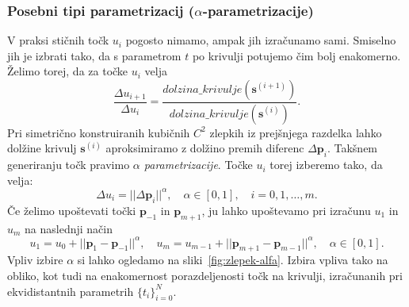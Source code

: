 \documentclass[isrm2, tisk]{fmfdelo}
\newcommand{\p}{\mathbf{p}}
\begin{document}
    \subsubsection{Posebni tipi parametrizacij ($\alpha$-parametrizacije)}
    V praksi stičnih točk $u_i$ pogosto nimamo, ampak jih izračunamo sami.
    Smiselno jih je izbrati tako, da s parametrom $t$ po krivulji potujemo čim bolj enakomerno.
    Želimo torej, da za točke $u_i$ velja \[\frac{\Delta u_{i+1}}{\Delta u_i} = \frac{dolzina\_krivulje(\mathbf{s}^{(i+1)})}{dolzina\_krivulje(\mathbf{s}^{(i)})}.\]
    Pri simetrično konstruiranih kubičnih $C^2$ zlepkih iz prejšnjega razdelka lahko dolžine krivulj $\mathbf{s}^{(i)}$ aproksimiramo z dolžino premih diferenc $\Delta \p_i$.
    Takšnem generiranju točk pravimo \textit{$\alpha$ parametrizacije}.
    Točke $u_i$ torej izberemo tako, da velja:
    \[\Delta u_i=||\Delta \p_i||^{\alpha},\quad \alpha\in[0,1],\quad i=0,1,\ldots,m.\]
    Če želimo upoštevati točki $\p_{-1}$ in $\p_{m+1}$, ju lahko upoštevamo pri izračunu $u_1$ in $u_m$ na naslednji način
    \[ u_1=u_0+|| \p_1-\p_{-1}||^{\alpha}, \quad  u_m=u_{m-1}+|| \p_{m+1}-\p_{m-1}||^{\alpha}, \quad  \alpha\in[0,1].\]
    Vpliv izbire $\alpha$ si lahko ogledamo na sliki~\ref{fig:zlepek-alfa}.
    Izbira vpliva tako na obliko, kot tudi na enakomernost porazdeljenosti točk na krivulji, izračunanih pri ekvidistantnih parametrih $\{t_i\}_{i=0}^{N}$.
\end{document}
